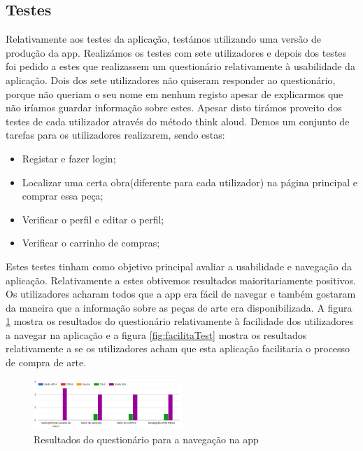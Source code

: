 \documentclass[conference]{IEEEtran}
\begin{document}
\subsection{Testes}

Relativamente aos testes da aplicação, testámos utilizando uma versão de produção da app. Realizámos os testes com sete utilizadores e depois dos testes foi pedido a estes que realizassem um questionário relativamente à usabilidade da aplicação. Dois dos sete utilizadores não quiseram responder ao questionário, porque não queriam o seu nome em nenhum registo apesar de explicarmos que não iríamos guardar informação sobre estes. Apesar disto tirámos proveito dos testes de cada utilizador através do método think aloud. Demos um conjunto de tarefas para os utilizadores realizarem, sendo estas:

\begin{itemize}
    \item Registar e fazer login;
    \item Localizar uma certa obra(diferente para cada utilizador) na página principal e comprar essa peça;
    \item Verificar o perfil e editar o perfil;
    \item Verificar o carrinho de compras;
\end{itemize}

Estes testes tinham como objetivo principal avaliar a usabilidade e navegação da aplicação. Relativamente a estes obtivemos resultados maioritariamente positivos. Os utilizadores acharam todos que a app era fácil de navegar e também gostaram da maneira que a informação sobre as peças de arte era disponibilizada. A figura
\ref{fig:navegacaoTest}
mostra os resultados do questionário relativamente à facilidade dos utilizadores a navegar na aplicação e a figura
\ref{fig:facilitaTest}
mostra os resultados relativamente a se os utilizadores acham que esta aplicação facilitaria o processo de compra de arte.

\begin{figure}[ht]
    \centering
    \includegraphics[width=0.5\textwidth]{questionarioNavegacao.png}
    \caption{Resultados do questionário para a navegação na app}
    \label{fig:navegacaoTest}
\end{figure}
\end{document}
